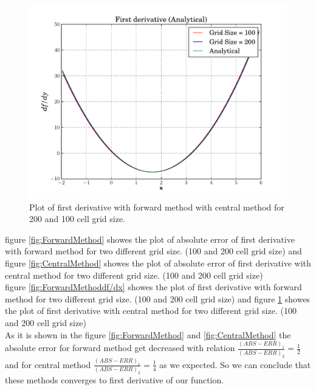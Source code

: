 \documentclass[10pt]{article}
\begin{document}
\begin{figure}[hbt]
  \begin{center}
    \includegraphics[scale=0.5]{Plots/plot4.pdf}
    \caption{\label{fig:CentralMethoddf/dx} Plot of first derivative with forward method with central method for 200 and 100 cell grid size.}
  \end{center}
\end{figure}

figure \ref{fig:ForwardMethod} showes the plot of absolute error of first derivative with forward method for two different grid size. (100 and 200 cell grid size) and figure \ref{fig:CentralMethod} showes the plot of absolute error of first derivative with central method for two different grid size. (100 and 200 cell grid size) \\


figure \ref{fig:ForwardMethoddf/dx} showes the plot of first derivative with forward method for two different grid size. (100 and 200 cell grid size) and figure \ref{fig:CentralMethoddf/dx} showes the plot of first derivative
with central method for two different grid size. (100 and 200 cell grid size) \\


As it is shown in the figure \ref{fig:ForwardMethod} and \ref{fig:CentralMethod} the absolute error for forward method get decreased with relation $\frac{(ABS-ERR)_1}{(ABS-ERR)_2} = \frac{1}{2}$ and for central method $\frac{(ABS-ERR)_1}{(ABS-ERR)_2} = \frac{1}{4}$  as we expected. So we can conclude that these methods converges to first derivative of our function.\\
\end{document}
